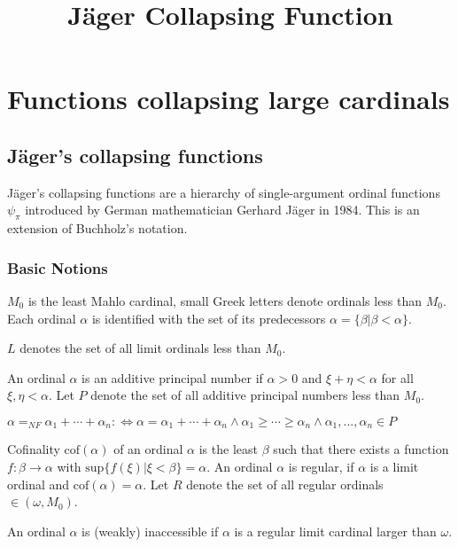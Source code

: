 \documentclass[10pt]{article}
\begin{document}
\title{Jäger Collapsing Function}

\maketitle

\setlength{\parindent}{0pt}

\section{Functions collapsing large cardinals}

\subsection{Jäger's collapsing functions}

Jäger's collapsing functions are a hierarchy of single-argument ordinal functions \(\psi_\pi\) introduced by German mathematician Gerhard Jäger in 1984. This is an extension of Buchholz's notation.


\subsubsection{Basic Notions}

\(M_0\) is the least Mahlo cardinal, small Greek letters denote ordinals less than \(M_0\). Each ordinal \(\alpha\) is identified with the set of its predecessors \(\alpha=\{\beta|\beta<\alpha\}\). 

\(L\) denotes the set of all limit ordinals less than \(M_0\).

An ordinal \(\alpha\) is an additive principal number if \(\alpha>0\) and \(\xi+\eta<\alpha\) for all \(\xi,\eta<\alpha\). Let \(P\) denote the set of all additive principal numbers less than \(M_0\).

\(\alpha=_{NF}\alpha _{1}+\cdots +\alpha _{n}:\Leftrightarrow \alpha =\alpha _{1}+\cdots +\alpha _{n}\wedge \alpha _{1}\geq \cdots \geq \alpha _{n}\wedge \alpha _{1},... ,\alpha _{n}\in P\)

Cofinality \(\text{cof}(\alpha)\) of an ordinal \(\alpha\) is the least \(\beta\) such that there exists a function \(f:\beta\rightarrow\alpha\) with \(\text{sup}\{f(\xi )|\xi <\beta \}=\alpha\). An ordinal \(\alpha\) is regular, if \(\alpha\) is a limit ordinal and \(\text{cof}(\alpha)=\alpha\). Let \(R\) denote the set of all regular ordinals \(\in(\omega, M_0)\). 

An ordinal \(\alpha\) is (weakly) inaccessible if \(\alpha\) is a regular limit cardinal larger than \(\omega\).
\end{document}
